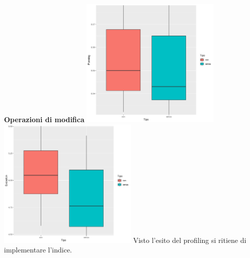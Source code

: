 \documentclass{article}
\begin{document}
\textbf{Operazioni di modifica}
\newline
\newline
\includegraphics[width=0.5\textwidth]{planning_impiegato_qualifica_modifica.png}
\includegraphics[width=0.5\textwidth]{execution_impiegato_qualifica_modifica.png}
\newline
\newline
Visto l'esito del profiling si ritiene di implementare l'indice.

\newpage
\end{document}
